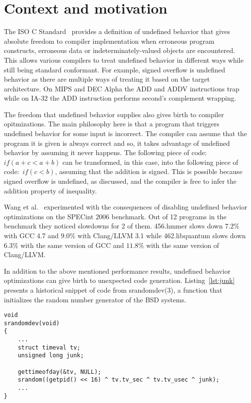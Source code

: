 \section{Context and motivation}

The ISO C Standard~\cite{iso90} provides a definition of undefined
behavior that gives absolute freedom to compiler implementation when
erroneous program constructs, erroneous data or indeterminately-valued
objects are encountered. This allows various compilers to treat
undefined behavior in different ways while still being standard
conformant. For example, signed overflow is undefined behavior as there
are multiple ways of treating it based on the target architecture. On
MIPS and DEC Alpha the ADD and ADDV instructions trap while on IA-32 the
ADD instruction performs second's complement wrapping.

The freedom that undefined behavior supplies also gives birth to
compiler opitmizations. The main philosophy here is that a program that
triggers undefined behavior for some input is incorrect. The compiler
can assume that the program it is given is always correct and so, it
takes advantage of undefined behavior by assuming it never happens. The
following piece of code:~\textit{\(if (a + c < a + b)\)} can be
transformed, in this case, into the following piece of
code:~\textit{\(if (c < b)\)}, assuming that the addition is signed.
This is possible because signed overflow is undefined, as discussed, and
the compiler is free to infer the addition property of inequality.

Wang et al.~\cite{wang2012undefined} experimented with the consequences
of disabling undefined behavior optimizations on the SPECint 2006
benchmark. Out of 12 programs in the benchmark they noticed slowdowns
for 2 of them. 456.hmmer slows down $7.2\%$ with GCC 4.7 and $9.0\%$
with Clang/LLVM 3.1 while 462.libquantum slows down $6.3\%$ with the
same version of GCC and $11.8\%$ with the same version of Clang/LLVM.

In addition to the above mentioned performance results, undefined
behavior optimizations can give birth to unexpected code generation.
Listing~\ref{lst:junk} presents a historical snippet of code from
srandomdev(3), a function that initializes the random number generator
of the BSD systems.

\begin{lstlisting}[style=Cstyle, caption={srandom function in
lib/libc/stdlib/random.c on BSD systems}, label={lst:junk}]
void
srandomdev(void)
{
	...
	struct timeval tv;
	unsigned long junk;

	gettimeofday(&tv, NULL);
	srandom((getpid() << 16) ^ tv.tv_sec ^ tv.tv_usec ^ junk);
	...
}
\end{lstlisting}


